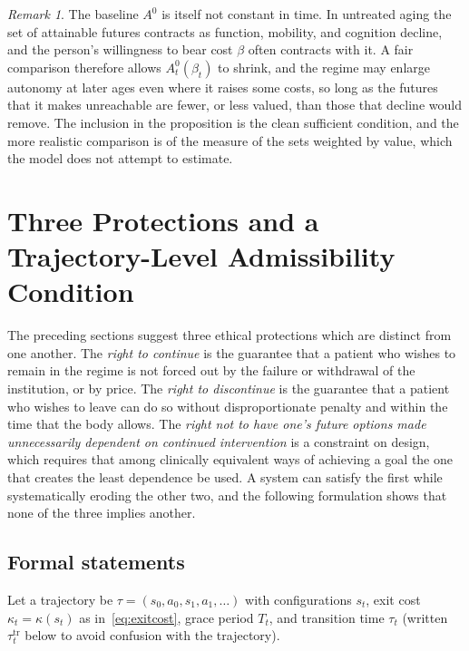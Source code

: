 \documentclass[11pt]{article}
\theoremstyle{plain}
\theoremstyle{definition}
\theoremstyle{remark}
\newtheorem{remark}{Remark}
\begin{document}
\begin{remark}
The baseline $A^0$ is itself not constant in time. In untreated aging the set of attainable futures contracts as function, mobility, and cognition decline, and the person's willingness to bear cost $\beta$ often contracts with it. A fair comparison therefore allows $A^0_t(\beta_t)$ to shrink, and the regime may enlarge autonomy at later ages even where it raises some costs, so long as the futures that it makes unreachable are fewer, or less valued, than those that decline would remove. The inclusion in the proposition is the clean sufficient condition, and the more realistic comparison is of the measure of the sets weighted by value, which the model does not attempt to estimate.
\end{remark}

\section{Three Protections and a Trajectory-Level Admissibility Condition}\label{sec:protections}

The preceding sections suggest three ethical protections which are distinct from one another. The \emph{right to continue} is the guarantee that a patient who wishes to remain in the regime is not forced out by the failure or withdrawal of the institution, or by price. The \emph{right to discontinue} is the guarantee that a patient who wishes to leave can do so without disproportionate penalty and within the time that the body allows. The \emph{right not to have one's future options made unnecessarily dependent on continued intervention} is a constraint on design, which requires that among clinically equivalent ways of achieving a goal the one that creates the least dependence be used. A system can satisfy the first while systematically eroding the other two, and the following formulation shows that none of the three implies another.

\subsection{Formal statements}

Let a trajectory be $\tau=(s_0,a_0,s_1,a_1,\dots)$ with configurations $s_t$, exit cost $\kappa_t=\kappa(s_t)$ as in~\eqref{eq:exitcost}, grace period $T_t$, and transition time $\tau_t$ (written $\tau_t^{\mathrm{tr}}$ below to avoid confusion with the trajectory).
\end{document}
